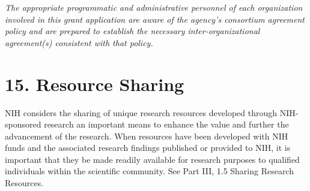 \documentclass[11pt,notitlepage]{article}
\begin{document}
\emph{The appropriate programmatic and administrative personnel of each organization involved in this grant application are aware of the agency's consortium agreement policy and are prepared to establish the necessary inter-organizational agreement(s) consistent with that policy.}


\newpage

\section*{15. Resource Sharing}

NIH considers the sharing of unique research resources developed through NIH-sponsored research an important means to enhance the value and further the advancement of the research. When resources have been developed with NIH funds and the associated research findings published or provided to NIH, it is important that they be made readily available for research purposes to qualified individuals within the scientific community. See Part III, 1.5 Sharing Research Resources.
\end{document}
